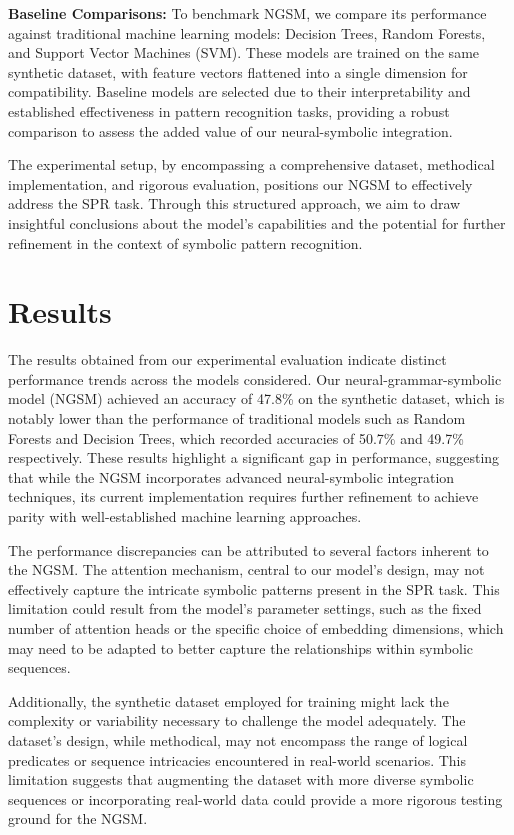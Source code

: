 \documentclass{article}
\begin{document}
\textbf{Baseline Comparisons:} To benchmark NGSM, we compare its performance against traditional machine learning models: Decision Trees, Random Forests, and Support Vector Machines (SVM). These models are trained on the same synthetic dataset, with feature vectors flattened into a single dimension for compatibility. Baseline models are selected due to their interpretability and established effectiveness in pattern recognition tasks, providing a robust comparison to assess the added value of our neural-symbolic integration.

The experimental setup, by encompassing a comprehensive dataset, methodical implementation, and rigorous evaluation, positions our NGSM to effectively address the SPR task. Through this structured approach, we aim to draw insightful conclusions about the model's capabilities and the potential for further refinement in the context of symbolic pattern recognition.

\section{Results}
The results obtained from our experimental evaluation indicate distinct performance trends across the models considered. Our neural-grammar-symbolic model (NGSM) achieved an accuracy of 47.8\% on the synthetic dataset, which is notably lower than the performance of traditional models such as Random Forests and Decision Trees, which recorded accuracies of 50.7\% and 49.7\% respectively. These results highlight a significant gap in performance, suggesting that while the NGSM incorporates advanced neural-symbolic integration techniques, its current implementation requires further refinement to achieve parity with well-established machine learning approaches.

The performance discrepancies can be attributed to several factors inherent to the NGSM. The attention mechanism, central to our model's design, may not effectively capture the intricate symbolic patterns present in the SPR task. This limitation could result from the model's parameter settings, such as the fixed number of attention heads or the specific choice of embedding dimensions, which may need to be adapted to better capture the relationships within symbolic sequences. 

Additionally, the synthetic dataset employed for training might lack the complexity or variability necessary to challenge the model adequately. The dataset's design, while methodical, may not encompass the range of logical predicates or sequence intricacies encountered in real-world scenarios. This limitation suggests that augmenting the dataset with more diverse symbolic sequences or incorporating real-world data could provide a more rigorous testing ground for the NGSM.
\end{document}

